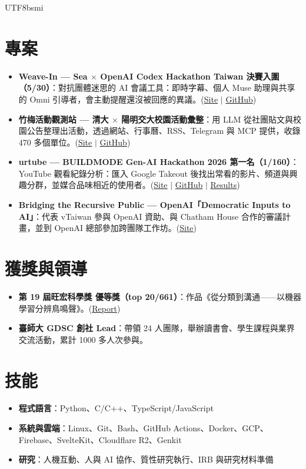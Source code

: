 \documentclass[letterpaper,10pt]{article}
\newcommand{\resumeItem}[2]{
  \item\small{
    \textbf{#1}{: #2 \vspace{-2pt}}
  }
}
\newcommand{\resumeSubItem}[2]{\resumeItem{#1}{#2}\vspace{-4pt}}
\newcommand{\resumeSubHeadingListStart}{\begin{itemize}[leftmargin=*]}
\newcommand{\resumeSubHeadingListEnd}{\end{itemize}}
\let\origtextbf\textbf
\renewcommand{\textbf}[1]{\origtextbf{\CJKbold #1\CJKnormal}}
\renewcommand{\resumeItem}[2]{
  \item\small{
    \textbf{#1}{：#2\vspace{-2pt}}
  }
}
\begin{document}
\begin{CJK}{UTF8}{bsmi}
\section{專案}
  \resumeSubHeadingListStart
    \resumeSubItem{Weave-In --- Sea $\times$ OpenAI Codex Hackathon Taiwan 決賽入圍（5/30）}
      {對抗團體迷思的 AI 會議工具：即時字幕、個人 Muse 助理與共享的 Omni 引導者，會主動提醒還沒被回應的異議。(\href{https://weave.nycu.ai/}{Site} $|$ \href{https://github.com/JacobLinCool/Weave-In}{GitHub})}
    \resumeSubItem{竹梅活動觀測站 --- 清大 $\times$ 陽明交大校園活動彙整}
      {用 LLM 從社團貼文與校園公告整理出活動，透過網站、行事曆、RSS、Telegram 與 MCP 提供，收錄 470 多個單位。(\href{https://chumei.observe.tw/}{Site} $|$ \href{https://github.com/skyhong2002/chumei}{GitHub})}
    \resumeSubItem{urtube --- BUILDMODE Gen-AI Hackathon 2026 第一名（1/160）}
      {YouTube 觀看紀錄分析：匯入 Google Takeout 後找出常看的影片、頻道與興趣分群，並媒合品味相近的使用者。(\href{https://urtube.observe.tw/}{Site} $|$ \href{https://github.com/skyhong2002/urtube}{GitHub} $|$ \href{https://hackathon2026.sitcon.org/finalists.html}{Results})}
\resumeSubItem{Bridging the Recursive Public --- OpenAI「Democratic Inputs to AI」}
  {代表 vTaiwan 參與 OpenAI 資助、與 Chatham House 合作的審議計畫，並到 OpenAI 總部參加跨團隊工作坊。(\href{https://vtaiwan-openai-2023.vercel.app/}{Site})}

  \resumeSubHeadingListEnd

\section{獲獎與領導}
  \resumeSubHeadingListStart
    \resumeSubItem{第 19 屆旺宏科學獎 優等獎（top 20/661）}{作品《從分類到溝通——以機器學習分辨鳥鳴聲》。(\href{https://www.mxeduc.org.tw/scienceaward/history/projectDoc/19th/doc/SA19-226_final.pdf}{Report})}
    \resumeSubItem{臺師大 GDSC 創社 Lead}
      {帶領 24 人團隊，舉辦讀書會、學生課程與業界交流活動，累計 1000 多人次參與。}
  \resumeSubHeadingListEnd

\section{技能}
\resumeSubHeadingListStart
  \resumeSubItem{程式語言}{Python、C/C++、TypeScript/JavaScript}
  \resumeSubItem{系統與雲端}{Linux、Git、Bash、GitHub Actions、Docker、GCP、Firebase、SvelteKit、Cloudflare R2、Genkit}
  \resumeSubItem{研究}{人機互動、人與 AI 協作、質性研究執行、IRB 與研究材料準備}
\resumeSubHeadingListEnd

\end{CJK}
\end{document}
